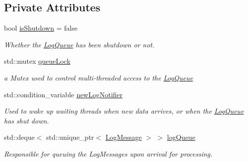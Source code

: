 \subsection*{Private Attributes}
\begin{DoxyCompactItemize}
\item 
\mbox{\label{class_aws_1_1_iot_1_1_device_client_1_1_logging_1_1_log_queue_a19081d3bfe573cc7c339c94af0191f9b}} 
bool \hyperlink{class_aws_1_1_iot_1_1_device_client_1_1_logging_1_1_log_queue_a19081d3bfe573cc7c339c94af0191f9b}{is\+Shutdown} = false
\begin{DoxyCompactList}\small\item\em Whether the \hyperlink{class_aws_1_1_iot_1_1_device_client_1_1_logging_1_1_log_queue}{Log\+Queue} has been shutdown or not. \end{DoxyCompactList}\item 
\mbox{\label{class_aws_1_1_iot_1_1_device_client_1_1_logging_1_1_log_queue_a66d900c666ee229611c0d93c14068a54}} 
std\+::mutex \hyperlink{class_aws_1_1_iot_1_1_device_client_1_1_logging_1_1_log_queue_a66d900c666ee229611c0d93c14068a54}{queue\+Lock}
\begin{DoxyCompactList}\small\item\em a Mutex used to control multi-\/threaded access to the \hyperlink{class_aws_1_1_iot_1_1_device_client_1_1_logging_1_1_log_queue}{Log\+Queue} \end{DoxyCompactList}\item 
\mbox{\label{class_aws_1_1_iot_1_1_device_client_1_1_logging_1_1_log_queue_a6dc1a27976cb58c747c1af33a12c28a4}} 
std\+::condition\+\_\+variable \hyperlink{class_aws_1_1_iot_1_1_device_client_1_1_logging_1_1_log_queue_a6dc1a27976cb58c747c1af33a12c28a4}{new\+Log\+Notifier}
\begin{DoxyCompactList}\small\item\em Used to wake up waiting threads when new data arrives, or when the \hyperlink{class_aws_1_1_iot_1_1_device_client_1_1_logging_1_1_log_queue}{Log\+Queue} has shut down. \end{DoxyCompactList}\item 
\mbox{\label{class_aws_1_1_iot_1_1_device_client_1_1_logging_1_1_log_queue_a239a0702bd5e299187454d3c6687b5fa}} 
std\+::deque$<$ std\+::unique\+\_\+ptr$<$ \hyperlink{class_aws_1_1_iot_1_1_device_client_1_1_logging_1_1_log_message}{Log\+Message} $>$ $>$ \hyperlink{class_aws_1_1_iot_1_1_device_client_1_1_logging_1_1_log_queue_a239a0702bd5e299187454d3c6687b5fa}{log\+Queue}
\begin{DoxyCompactList}\small\item\em Responsible for queuing the Log\+Messages upon arrival for processing. \end{DoxyCompactList}\end{DoxyCompactItemize}


